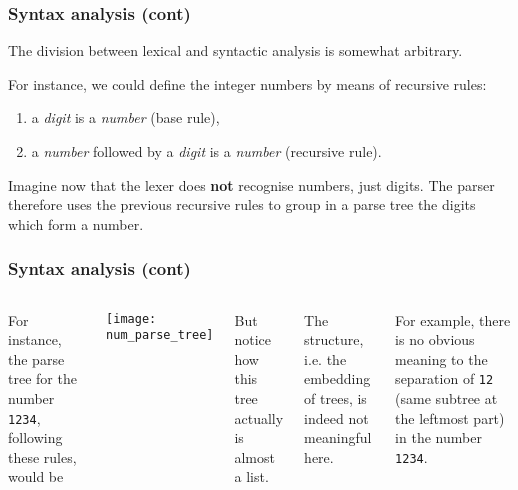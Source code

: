 % 
\begin{frame}
\frametitle{Syntax analysis (cont)}

The division between lexical and syntactic analysis is somewhat
arbitrary. 

\bigskip

For instance, we could define the integer numbers by means
of recursive rules:
\begin{enumerate}

  \item a \emph{digit} is a \emph{number} (base rule),

  \item a \emph{number} followed by a \emph{digit} is a
  \emph{number} (recursive rule).

\end{enumerate}
Imagine now that the lexer does \textbf{not} recognise numbers, just
 digits. The parser therefore uses the previous recursive rules to
 group in a parse tree the digits which form a number.

\end{frame}

% 
\begin{frame}
\frametitle{Syntax analysis (cont)}
 
\begin{columns}

   For instance, the parse tree for the number
  \texttt{1234}, following these rules, would be
  \begin{center}
    \texttt{[image: num\_parse\_tree]}
  \end{center}

  But notice how this tree actually is almost a list. 

  \bigskip

  The structure, i.e. the embedding of trees, is indeed not meaningful
  here.

  \bigskip

  For example, there is no obvious meaning to the separation of
  \texttt{12} (same subtree at the leftmost part) in the number
  \texttt{1234}.
\end{columns}

\end{frame}

